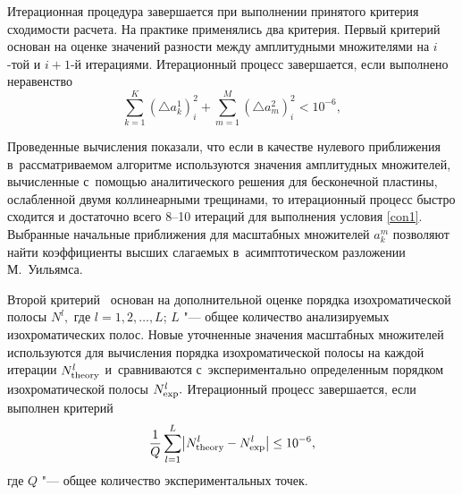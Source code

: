 Итерационная процедура завершается при выполнении принятого критерия сходимости расчета. 
На практике применялись два критерия. 
Первый критерий основан на оценке значений разности между амплитудными множителями на $i$-той и $i+1$-й итерациями. 
Итерационный процесс завершается, если выполнено неравенство
\begin{equation}
\sum_{k=1}^K (\triangle a_{k}^1)_i^2 + \sum_{m=1}^M (\triangle a_{m}^2)_i^2 < 10^{-6},
\label{con1}
\end{equation}
 
Проведенные вычисления показали, что если в качестве нулевого приближения в~рассматриваемом алгоритме используются значения амплитудных множителей, вычисленные с~помощью аналитического решения для бесконечной пластины, ослабленной двумя коллинеарными трещинами, то итерационный процесс быстро сходится и достаточно всего 8--10 итераций для выполнения условия \eqref{con1}. 
Выбранные начальные приближения для масштабных множителей $a^m_k$ позволяют найти коэффициенты высших слагаемых в~асимптотическом разложении М.~Уильямса.
 
 
 Второй критерий~\cite{ram1997} основан на дополнительной оценке порядка изохроматической полосы $N^l,$ где $l=1, 2, \dots, L$; $L$ "--- общее количество анализируемых изохроматических полос. 
 Новые уточненные значения масштабных множителей используются для вычисления порядка изохроматической полосы на каждой итерации $N_{\rm theory}^l$ и~сравниваются с~экспериментально определенным порядком изохроматической полосы $N_{\rm exp}^l.$ 
 Итерационный процесс завершается, если выполнен критерий
\begin{eqnarray}
\frac 1Q  \sum \limits_{l=1}^L \bigl|N_{\rm theory}^l-N_{\rm exp}^l \bigr| \le 10^{-6},
\end{eqnarray}
где  $Q$ "--- общее количество экспериментальных точек.



